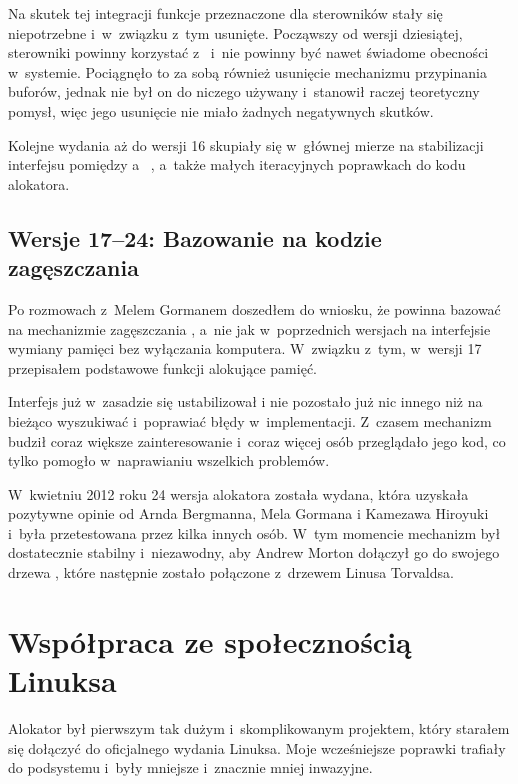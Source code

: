 Na skutek tej integracji funkcje  przeznaczone dla sterowników
stały się niepotrzebne i~w~związku z~tym usunięte.  Począwszy od
wersji dziesiątej, sterowniki powinny korzystać z~  i~nie
powinny być nawet świadome obecności  w~systemie.  Pociągnęło to za
sobą również usunięcie mechanizmu przypinania buforów, jednak nie był
on do niczego używany i~stanowił raczej teoretyczny pomysł, więc jego
usunięcie nie miało żadnych negatywnych skutków.

Kolejne wydania  aż do wersji 16 skupiały się w~głównej mierze na
stabilizacji interfejsu pomiędzy  a~ , a~także małych
iteracyjnych poprawkach do kodu alokatora.

\subsection{Wersje 17--24: Bazowanie na kodzie zagęszczania}

Po rozmowach z~Melem Gormanem doszedłem do wniosku, że  powinna
bazować na mechanizmie zagęszczania \autocite{bib:compaction,
  bib:supporting-large-contig-regions}, a~nie jak w~poprzednich
wersjach na interfejsie wymiany pamięci  bez wyłączania komputera.
W~związku z~tym, w~wersji 17 przepisałem podstawowe funkcji alokujące
pamięć.

Interfejs  już w~zasadzie się ustabilizował i nie pozostało już nic
innego niż na bieżąco wyszukiwać i~poprawiać błędy w~implementacji.
Z~czasem mechanizm  budził coraz większe zainteresowanie i~coraz
więcej osób przeglądało jego kod, co tylko pomogło w~naprawianiu
wszelkich problemów.

W~kwietniu 2012 roku 24 wersja alokatora  została wydana,
która uzyskała pozytywne opinie od Arnda Bergmanna, Mela Gormana
i Kamezawa Hiroyuki i~była przetestowana przez kilka innych osób.
W~tym momencie mechanizm  był dostatecznie stabilny
i~niezawodny, aby Andrew Morton dołączył go do swojego drzewa
, które następnie zostało połączone z~drzewem Linusa
Torvaldsa. 

\section{Współpraca ze społecznością Linuksa}

Alokator  był pierwszym tak dużym i~skomplikowanym projektem, który
starałem się dołączyć do oficjalnego wydania Linuksa.  Moje
wcześniejsze poprawki trafiały do podsystemu  i~były mniejsze
i~znacznie mniej inwazyjne.

